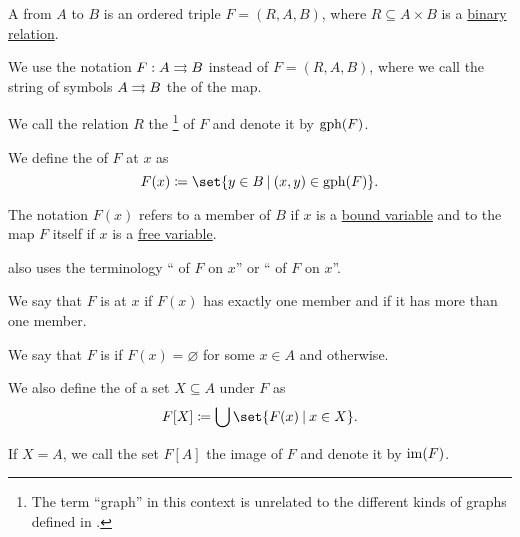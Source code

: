 \begin{definition}\label{def:set_valued_map}
  A  from \( A \) to \( B \) is an ordered triple \( F = (R, A, B) \), where \( R \subseteq A \times B \) is a \hyperref[def:binary_relation]{binary relation}.

  We use the notation \( F: A \rightrightarrows B \) instead of \( F = (R, A, B) \), where we call the string of symbols \( A \rightrightarrows B \) the  of the map.

  \begin{thmenum}[series=def:set_valued_map]
     We call the relation \( R \) the \footnote{The term \enquote{graph} in this context is unrelated to the different kinds of graphs defined in .} of \( F \) and denote it by \( \operatorname{gph}(F) \).

     We define the  of \( F \) at \( x \) as
    \begin{equation*}
      F(x) \coloneqq \set{ y \in B \given (x, y) \in \gph(F) }.
    \end{equation*}

    The notation \( F(x) \) refers to a member of \( B \) if \( x \) is a \hyperref[def:first_order_syntax/formula_bound_variables]{bound variable} and to the map \( F \) itself if \( x \) is a \hyperref[def:first_order_syntax/formula_free_variables]{free variable}.

     also uses the terminology \enquote{ of \( F \) on \( x \)} or \enquote{ of \( F \) on \( x \)}.

    We say that \( F \) is  at \( x \) if \( F(x) \) has exactly one member and  if it has more than one member.

     We say that \( F \) is  if \( F(x) = \varnothing \) for some \( x \in A \) and  otherwise.

     We also define the  of a set \( X \subseteq A \) under \( F \) as
    \begin{equation*}
      F[X] \coloneqq \bigcup \set{ F(x) \given x \in X }.
    \end{equation*}

    If \( X = A \), we call the set \( F[A] \) the image of \( F \) and denote it by \( \operatorname{im}(F) \).


\end{thmenum}
\end{definition}
